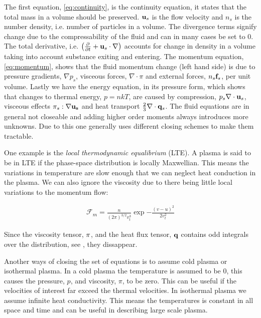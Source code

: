 	The first equation, \cref{eq:continuity}, is the continuity equation, it states that the total mass
	in a volume	should be preserved. \(\vb{u}_s\) is the flow velocity and \(n_s\) is the number density, i.e.
	number of particles in a volume. The divergence terms signify change due to the compressability of the fluid
	and can in many cases be set to \(0\). The total derivative, i.e. \(\left(\pdv{t} + \vb{u}_s\cdot\nabla \right)\) accounts for
	change in density in a volume taking into account substance exiting and entering.
	The momentum equation, \cref{eq:momentum}, shows that the fluid momentum change (left hand side)
	is due to pressure gradients, \(\nabla p_s\), visceous forces, \(\nabla \cdot \pi \) and external forces, \(n_s\vb{f}_s\),
	per unit volume.
	Lastly we have the energy equation, in its pressure form, which shows that changes to thermal
	energy, \(p = nkT\), are caused by compression, \(p_s\nabla \cdot \vb{u}_s\), visceous effects \(\pi_s : \nabla{\vb{u_s}}\)
	and heat transport	\(\frac{2}{3}\nabla \cdot \vb{q}_s\).
	The fluid equations are in general not closeable and adding higher order moments
	always introduces more unknowns. Due to this one generally uses different closing
	schemes to make them tractable.

	One example is the \textit{local thermodynamic equalibrium} (LTE).
	A plasma is said to be in LTE if the phase-space distribution is locally Maxwellian. This means the variations
	in temperature are slow enough that we can neglect heat conduction in the plasma. We can also ignore
	the viscosity due to there being little local variations to the momentum flow:

	\begin{align}
		\mathcal{F}_m = \frac{n}{(2\pi )^{3/2}v_t^3} \exp{-\frac{(v-u)^2}{2v_t^2}}
	\end{align}

	Since the viscosity tensor, \(\vb{\pi}\), and the heat flux tensor, \(\vb{q}\)
	contains odd integrals over the distribution, see \citet{fitzpatrick_plasma_2014},
	they dissappear.

	Another ways of closing the set of equations is to assume cold plasma or isothermal plasma.
	In a cold plasma the temperature is assumed to be \(0\), this causes the pressure, \(p\), and viscosity, \(\pi\), to be zero.
	This can be useful if the velocities of interest far exceed the thermal velocities.
	In isothermal plasma we assume infinite heat conductivity.
	This means the temperatures is constant in all space and time and can be useful in
	describing large scale plasma.
